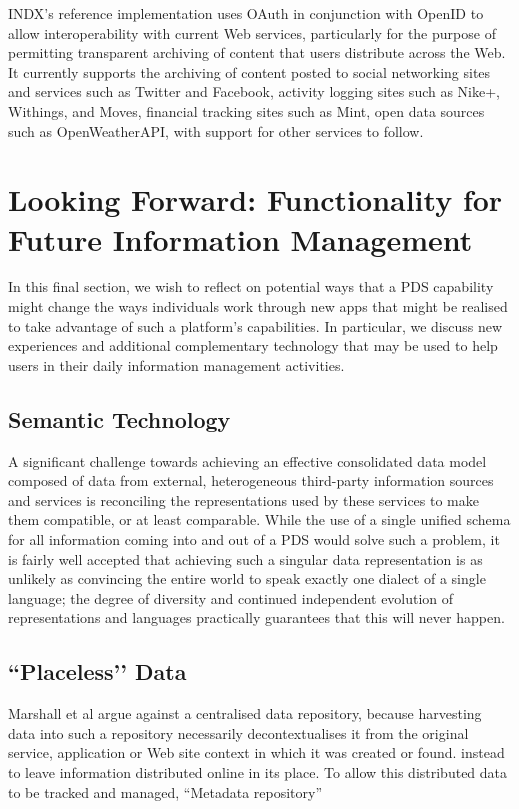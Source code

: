\documentclass[graybox]{svmult}
\begin{document}
INDX’s reference implementation uses OAuth in conjunction with OpenID to allow interoperability with current Web services, particularly for the purpose of permitting transparent archiving of content that users distribute across the Web.  It currently supports the archiving of content posted to social networking sites and services such as Twitter and Facebook, activity logging sites such as Nike+, Withings, and Moves,  financial tracking sites such as Mint, open data sources such as OpenWeatherAPI, with support for other services to follow.

\section{Looking Forward: Functionality for Future Information Management}

In this final section, we wish to reflect on potential ways that a PDS capability might change the ways individuals work through new apps that might be realised to take advantage of such a platform’s capabilities. In particular, we discuss new experiences and additional complementary technology that may be used to help users in their daily information management activities.

\subsection{Semantic Technology}
A significant challenge towards achieving an effective consolidated data model composed of data from external, heterogeneous third-party information sources and services is reconciling the representations used by these services to make them compatible, or at least comparable.  While the use of a single unified schema for all information coming into and out of a PDS would solve such a problem, it is fairly well accepted that achieving such a singular data representation is as unlikely as convincing the entire world to speak exactly one dialect of a single language; the degree of diversity and continued independent evolution of representations and languages practically guarantees that this will never happen\cite{}. 

\subsection{``Placeless’’ Data}
Marshall et al argue against a centralised data repository, because harvesting data into such a repository necessarily decontextualises it from the original service, application or Web site context in which it was created or found. instead to leave information distributed online in its place.  To allow this distributed data to be tracked and managed, “Metadata repository” 
\end{document}

